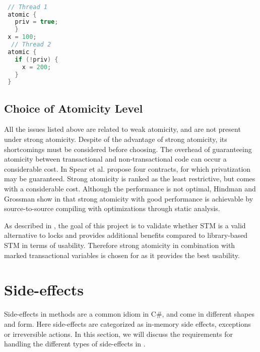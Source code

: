 \begin{lstlisting}[label=lst:privatization,
 caption={Privatization Problem},
 language=Java, 
 showspaces=false,
 showtabs=false,
 breaklines=true,
 showstringspaces=false,
 breakatwhitespace=true,
 commentstyle=\color{greencomments},
 keywordstyle=\color{bluekeywords},
 stringstyle=\color{redstrings},
 morekeywords={atomic, retry, orElse, var, get, set}]  % Start your code-block

 // Thread 1
 atomic {
   priv = true;
   }
 x = 100;
  // Thread 2
 atomic {
   if (!priv) {
     x = 200;
   }
 }
\end{lstlisting}

\subsection{Choice of Atomicity Level}
All the issues listed above are related to weak atomicity, and are not present under strong atomicity. Despite of the advantage of strong atomicity, its shortcomings must be considered before choosing. The overhead of guaranteeing atomicity between transactional and non-transactional code can occur a considerable cost\cite{spear2007privatization}. In \cite{spear2007privatization} Spear et al. propose four contracts, for which privatization may be guaranteed. Strong atomicity is ranked as the least restrictive, but comes with a considerable cost. Although the performance is not optimal, Hindman and Grossman show in \cite{hindman2006atomicity} that strong atomicity with good performance is achievable by source-to-source compiling with optimizations through static analysis.

As described in , the goal of this project is to validate whether \ac{STM} is a valid alternative to locks and provides additional benefits compared to library-based \ac{STM} in terms of usability. Therefore strong atomicity in combination with marked transactional variables is chosen for \stmname as it provides the best usability.

\section{Side-effects}\label{sec:side-effects}
Side-effects in methods are a common idiom in C\#, and come in different shapes and form. Here side-effects are categorized as in-memory side effects, exceptions or irreversible actions. In this section, we will discuss the requirements for handling the different types of side-effects in \stmname.

